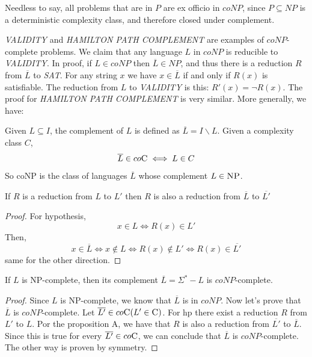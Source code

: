 \documentclass[12pt]{article}
\newcommand{\coNP}{co\textsc{NP }}
\newcommand{\coC}{co\textsc{C}}
\begin{document}
Needless to say, all problems that are in $P$ are ex officio in $coNP$, since $P \subseteq NP$ is a deterministic complexity class, and therefore closed under complement.

\textit{VALIDITY} and \textit{HAMILTON PATH COMPLEMENT} are examples of $coNP$-complete problems. We claim that any language $L$ in $coNP$ is reducible to \textit{VALIDITY}. In proof, if $L \in coNP$ then $\overline{L} \in NP$, and thus there is a reduction $R$ from $\overline{L}$ to \textit{SAT}. For any string $x$ we have $x \in \overline{L}$ if and only if $R(x)$ is satisfiable. The reduction from $L$ to \textit{VALIDITY} is this: $R'(x) = \neg R(x)$. The proof for \textit{HAMILTON PATH COMPLEMENT} is very similar. More generally, we have:

\begin{defbox}
 Given $L\subseteq I$, the complement of $L$ is defined as $\overline{L} = I \smallsetminus L$. 
 Given a complexity class $C$, 
 $$\overline{L}\in co\textsc{C} \iff L\in C$$
 So \coNP is the class of languages $\overline{L}$ whose complement $L\in\textsc{NP}$.
\end{defbox}

\begin{defbox}[Proposition A]
  If $R$ is a reduction from $L$ to $L'$ then $R$ is also a reduction from $\overline{L}$ to $\overline{L'}$
\end{defbox}
\begin{proof}
  For hypothesis, $$x\in L\iff R(x)\in L'$$
  Then, 
  $$x\in \overline{L} \iff x\notin L \iff R(x)\notin L' \iff R(x)\in \overline{L'}$$
  same for the other direction.
\end{proof}
\begin{defbox}[Proposition B]
If $L$ is \textsc{NP}-complete, then its complement $\overline{L} = \Sigma^* - L$ is $coNP$-complete.
\end{defbox}
\begin{proof}
  Since $L$ is \textsc{NP}-complete, we know that $\overline{L}$ is in $coNP$. Now let's prove that $\overline{L}$ is $coNP$-complete. Let $\overline{L'}\in \coC (L'\in \textsc{C})$. For hp there exist a reduction $R$ from $L'$ to $L$. Por the  proposition A, we have that $R$ is also a reduction from $\overline{L'}$ to $\overline{L}$. Since this is true for every $\overline{L'}\in\coC$, we can conclude that $\overline{L}$ is $coNP$-complete.
  The other way is proven by symmetry.
\end{proof}
\end{document}
